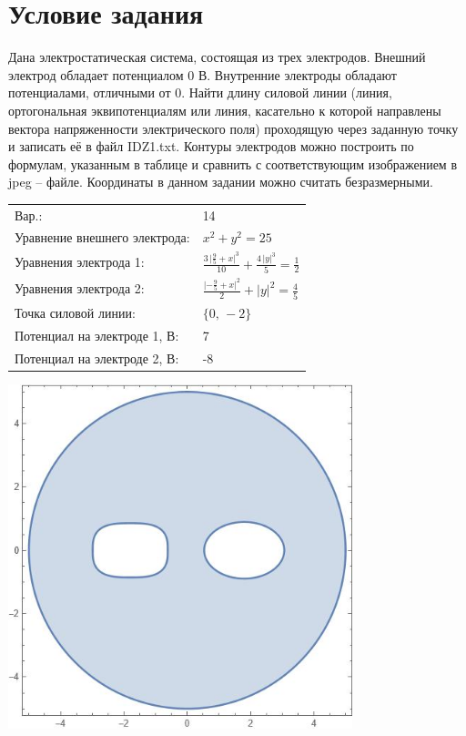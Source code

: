 \documentclass[12pt]{article}
\begin{document}
\section*{Условие задания}
Дана электростатическая система, состоящая из трех электродов. Внешний электрод обладает потенциалом 0 В. Внутренние электроды обладают потенциалами, отличными от 0. Найти длину силовой линии (линия, ортогональная эквипотенциалям или линия, касательно к которой направлены вектора напряженности электрического поля) проходящую через заданную точку и записать её в файл IDZ1.txt. Контуры электродов можно построить по формулам, указанным в таблице и сравнить с соответствующим изображением в jpeg – файле. Координаты в данном задании можно считать безразмерными.
\begin{center}
\begin{tabular}{|l|l|}
\hline
Вар.: &14 \\
Уравнение внешнего электрода: &\(x^2 + y^2 = 25\) \\
Уравнения электрода 1: &\(\frac{3\,\lvert\frac{9}{5}+x\rvert^3}{10} + \frac{4\,\lvert y\rvert^3}{5} = \frac{1}{2}\) \\
Уравнения электрода 2: &\(\frac{\lvert -\frac{9}{5}+x\rvert^2}{2} + \lvert y\rvert^2 = \frac{4}{5}\) \\
Точка силовой линии: &\(\{0,\,-2\}\) \\
Потенциал на электроде 1, В: &7 \\
Потенциал на электроде 2, В: &-8 \\
\hline
\end{tabular}
\end{center}

\begin{center}
    \includegraphics[width=0.75\textwidth]{pictures/14.jpeg}
\end{center}
\end{document}

